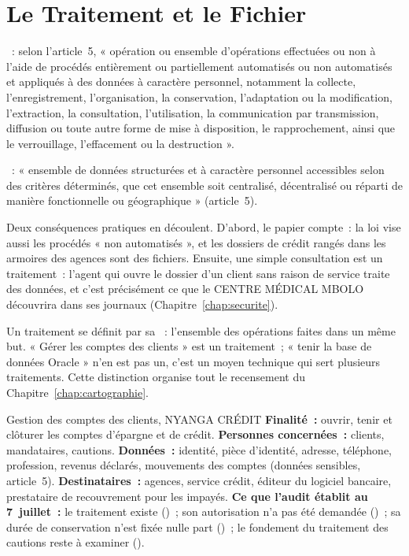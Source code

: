 \section{Le Traitement et le Fichier}
\label{sec:c01-traitement}

\begin{boxdef}
~: selon l'article~5, « opération ou ensemble
d'opérations effectuées ou non à l'aide de procédés entièrement ou
partiellement automatisés ou non automatisés et appliqués à des données à
caractère personnel, notamment la collecte, l'enregistrement,
l'organisation, la conservation, l'adaptation ou la modification,
l'extraction, la consultation, l'utilisation, la communication par
transmission, diffusion ou toute autre forme de mise à disposition, le
rapprochement, ainsi que le verrouillage, l'effacement ou la destruction ».

\smallskip
{}~: « ensemble de données structurées et à caractère
personnel accessibles selon des critères déterminés, que cet ensemble soit
centralisé, décentralisé ou réparti de manière fonctionnelle ou
géographique » (article~5).
\end{boxdef}

Deux conséquences pratiques en découlent. D'abord, le papier compte~: la
loi vise aussi les procédés « non automatisés », et les dossiers de crédit
rangés dans les armoires des agences sont des fichiers. Ensuite, une simple
consultation est un traitement~: l'agent qui ouvre le dossier d'un client
sans raison de service traite des données, et c'est précisément ce que le
CENTRE MÉDICAL MBOLO découvrira dans ses journaux (Chapitre~\ref{chap:securite}).

Un traitement se définit par sa ~: l'ensemble des
opérations faites dans un même but. « Gérer les comptes des clients » est
un traitement~; « tenir la base de données Oracle » n'en est pas un, c'est
un moyen technique qui sert plusieurs traitements. Cette distinction
organise tout le recensement du Chapitre~\ref{chap:cartographie}.

\begin{boxobjet}{Gestion des comptes des clients, NYANGA CRÉDIT}
\textbf{Finalité~:} ouvrir, tenir et clôturer les comptes d'épargne et de
crédit. \textbf{Personnes concernées~:} clients, mandataires, cautions.
\textbf{Données~:} identité, pièce d'identité, adresse, téléphone,
profession, revenus déclarés, mouvements des comptes (données sensibles,
article~5). \textbf{Destinataires~:} agences, service crédit, éditeur du
logiciel bancaire, prestataire de recouvrement pour les impayés.
\textbf{Ce que l'audit établit au 7~juillet~:} le traitement existe
(\OUI{})~; son autorisation n'a pas été demandée (\NON{})~; sa durée de
conservation n'est fixée nulle part (\NON{})~; le fondement du traitement
des cautions reste à examiner (\NEK{}).
\end{boxobjet}

